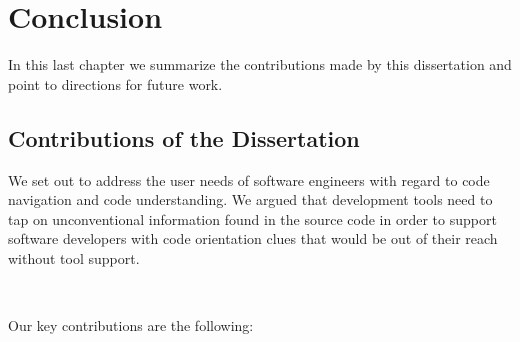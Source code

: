 \chapter{Conclusion}
\label{the conclusion}

In this last chapter we summarize the contributions made by this dissertation and point to directions for future work.

\section{Contributions of the Dissertation}

We set out to address the user needs of software engineers with regard to code navigation and code understanding. We argued that development tools need to tap on unconventional information found in the source code in order to support software developers with code orientation clues that would be out of their reach without tool support. 

~

\noindent Our key contributions are the following:

